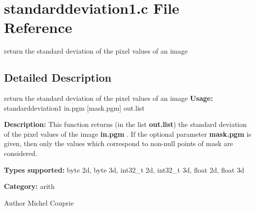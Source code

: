 \section{standarddeviation1.c File Reference}
\label{standarddeviation1_8c}


return the standard deviation of the pixel values of an image  




\subsection{Detailed Description}
return the standard deviation of the pixel values of an image {\bfseries Usage:} standarddeviation1 in.pgm [mask.pgm] out.list

{\bfseries Description:} This function returns (in the list {\bfseries out.list}) the standard deviation of the pixel values of the image {\bfseries in.pgm} . If the optional parameter {\bfseries mask.pgm} is given, then only the values which correspond to non-\/null points of mask are considered.

{\bfseries Types supported:} byte 2d, byte 3d, int32\_\-t 2d, int32\_\-t 3d, float 2d, float 3d

{\bfseries Category:} arith

\begin{DoxyAuthor}{Author}
Michel Couprie 
\end{DoxyAuthor}

